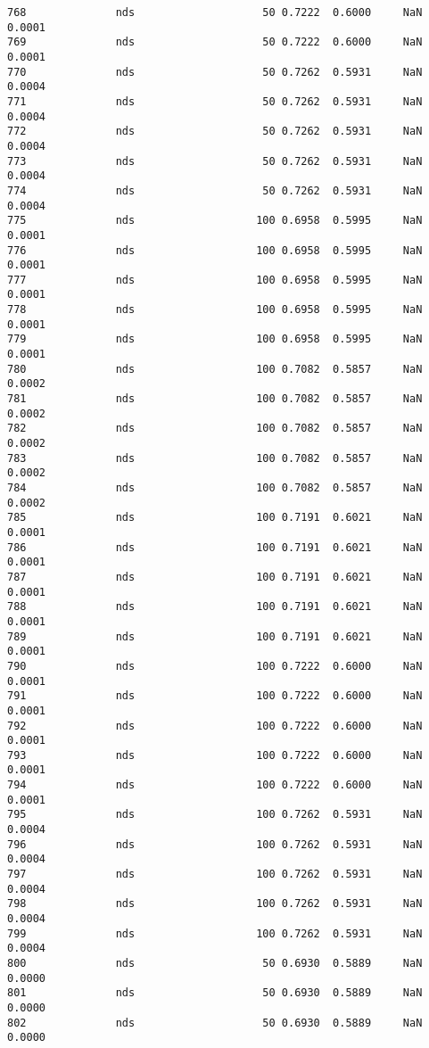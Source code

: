 \documentclass[11pt]{article}
\begin{document}
\begin{Verbatim}[commandchars=\\\{\}]
768              nds                    50 0.7222  0.6000     NaN 0.0001   
769              nds                    50 0.7222  0.6000     NaN 0.0001   
770              nds                    50 0.7262  0.5931     NaN 0.0004   
771              nds                    50 0.7262  0.5931     NaN 0.0004   
772              nds                    50 0.7262  0.5931     NaN 0.0004   
773              nds                    50 0.7262  0.5931     NaN 0.0004   
774              nds                    50 0.7262  0.5931     NaN 0.0004   
775              nds                   100 0.6958  0.5995     NaN 0.0001   
776              nds                   100 0.6958  0.5995     NaN 0.0001   
777              nds                   100 0.6958  0.5995     NaN 0.0001   
778              nds                   100 0.6958  0.5995     NaN 0.0001   
779              nds                   100 0.6958  0.5995     NaN 0.0001   
780              nds                   100 0.7082  0.5857     NaN 0.0002   
781              nds                   100 0.7082  0.5857     NaN 0.0002   
782              nds                   100 0.7082  0.5857     NaN 0.0002   
783              nds                   100 0.7082  0.5857     NaN 0.0002   
784              nds                   100 0.7082  0.5857     NaN 0.0002   
785              nds                   100 0.7191  0.6021     NaN 0.0001   
786              nds                   100 0.7191  0.6021     NaN 0.0001   
787              nds                   100 0.7191  0.6021     NaN 0.0001   
788              nds                   100 0.7191  0.6021     NaN 0.0001   
789              nds                   100 0.7191  0.6021     NaN 0.0001   
790              nds                   100 0.7222  0.6000     NaN 0.0001   
791              nds                   100 0.7222  0.6000     NaN 0.0001   
792              nds                   100 0.7222  0.6000     NaN 0.0001   
793              nds                   100 0.7222  0.6000     NaN 0.0001   
794              nds                   100 0.7222  0.6000     NaN 0.0001   
795              nds                   100 0.7262  0.5931     NaN 0.0004   
796              nds                   100 0.7262  0.5931     NaN 0.0004   
797              nds                   100 0.7262  0.5931     NaN 0.0004   
798              nds                   100 0.7262  0.5931     NaN 0.0004   
799              nds                   100 0.7262  0.5931     NaN 0.0004   
800              nds                    50 0.6930  0.5889     NaN 0.0000   
801              nds                    50 0.6930  0.5889     NaN 0.0000   
802              nds                    50 0.6930  0.5889     NaN 0.0000   

\end{Verbatim}
\end{document}
